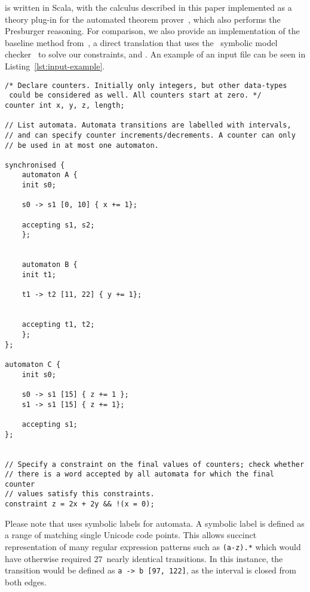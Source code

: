 \documentclass[acmsmall,review,anonymous]{acmart}\settopmatter{printfolios=true,printccs=false,printacmref=true}
\theoremstyle{definition}
\begin{document}
\Catra{} is written in Scala, with the calculus described in this paper
implemented as a theory plug-in for the \Princess{} automated theorem
prover~\cite{princess}, which also performs the Presburger reasoning. For
comparison, we also provide an implementation of the baseline method
from~\cite{generate-parikh-image}, a direct translation that uses the~\Nuxmv{}
symbolic model checker~\cite{nuxmv} to solve our constraints, and . An example of an input file  can be seen in Listing~\ref{lst:input-example}.

\begin{lstlisting}[caption={An example input file for \Catra{}, illustrating every major syntax element. From beginning to end: synchronised (product) automata using the keyword \texttt{synchronised} (automata A and B), range labels, and their single-character shorthand syntax, register increments, and constraints on the final values of their counters.}, label=lst:input-example]
  /* Declare counters. Initially only integers, but other data-types
 could be considered as well. All counters start at zero. */
counter int x, y, z, length;

// List automata. Automata transitions are labelled with intervals,
// and can specify counter increments/decrements. A counter can only
// be used in at most one automaton.

synchronised {
    automaton A {
    init s0;

    s0 -> s1 [0, 10] { x += 1};

    accepting s1, s2;
    };


    automaton B {
    init t1;

    t1 -> t2 [11, 22] { y += 1};


    accepting t1, t2;
    };
};

automaton C {
    init s0;

    s0 -> s1 [15] { z += 1 };
    s1 -> s1 [15] { z += 1};

    accepting s1;
};


// Specify a constraint on the final values of counters; check whether
// there is a word accepted by all automata for which the final counter
// values satisfy this constraints.
constraint z = 2x + 2y && !(x = 0);
\end{lstlisting}

Please note that \Catra{} uses symbolic labels for automata. A symbolic label is
defined as a range of matching single Unicode code points. This allows succinct
representation of many regular expression patterns such as \lstinline{(a-z).*}
which would have otherwise required $27$~nearly identical transitions. In this
instance, the transition would be defined as \lstinline{a -> b [97, 122]}, as the
interval is closed from both edges.
\end{document}
